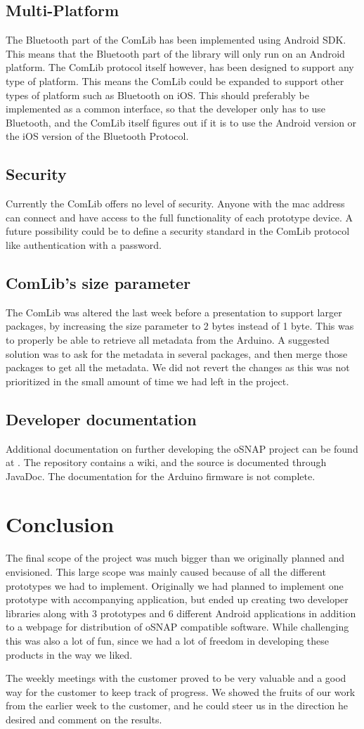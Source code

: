 \subsection{Multi-Platform}
The Bluetooth part of the ComLib has been implemented using Android SDK. This means that 
the Bluetooth part of the library will only run on an Android platform. The ComLib protocol
itself however, has been designed to support any type of platform. This means the ComLib
could be expanded to support other types of platform such as Bluetooth on iOS. This
should preferably be implemented as a common interface, so that the developer only has to use
Bluetooth, and the ComLib itself figures out if it is to use the Android version or the iOS version of
the Bluetooth Protocol.

\subsection{Security}
Currently the ComLib offers no level of security. Anyone with the mac address can connect
and have access to the full functionality of each prototype device. A future possibility could
be to define a security standard in the ComLib protocol like authentication with a password.

\subsection{ComLib's size parameter}
The ComLib was altered the last week before a presentation to support larger packages, by increasing the size parameter to 2 bytes instead of 1 byte. This was to properly
be able to retrieve all metadata from the Arduino. A suggested solution was to ask for the metadata
in several packages, and then merge those packages to get all the metadata. We did not revert the changes
as this was not prioritized in the small amount of time we had left in the project.

\subsection{Developer documentation}
Additional documentation on further developing the oSNAP project can be found at \cite{link:github-osnap}.
The repository contains a wiki, and the source is documented through JavaDoc. The documentation for the Arduino firmware is not complete.

\section{Conclusion}
The final scope of the project was much bigger than we originally planned and envisioned. This large scope
was mainly caused because of all the different prototypes we had to implement. Originally we had planned
to implement one prototype with accompanying application, but ended up creating two developer libraries
along with 3 prototypes and 6 different Android applications in addition to a webpage for distribution of oSNAP
compatible software. While challenging this was also a lot of fun, since we had a lot of freedom in developing
these products in the way we liked.

The weekly meetings with the customer proved to be very valuable and
a good way for the customer to keep track of progress. We showed the fruits of our work from the earlier
week to the customer, and he could steer us in the direction he desired and comment on the results.
